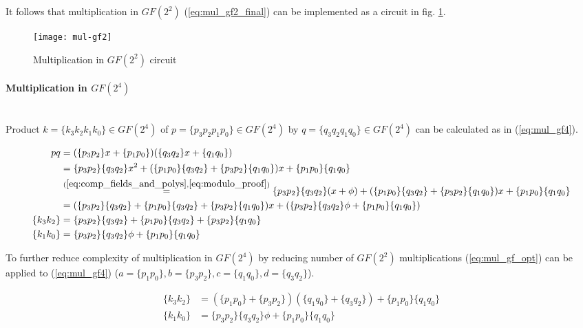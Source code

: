 It follows that multiplication in $GF(2^2)$ (\ref{eq:mul_gf2_final}) can be implemented as a circuit in fig. \ref{fig:mul_gf2}.

\begin{figure}[!h]
\label{fig:mul_gf2}
\centering
\texttt{[image: mul-gf2]}
\caption{Multiplication in $GF(2^2)$ circuit}
\end{figure}



\paragraph{Multiplication in $GF(2^4)$}\mbox{}\\
Product $k = \{k_3k_2k_1k_0\} \in GF(2^4)$ of $p = \{p_3p_2p_1p_0\} \in GF(2^4)$ by $q = \{q_3q_2q_1q_0\} \in GF(2^4)$ can be calculated as in (\ref{eq:mul_gf4}).

\begin{equation}
\label{eq:mul_gf4}
\begin{aligned}
pq &= (\{p_3p_2\}x + \{p_1p_0\})(\{q_3q_2\}x + \{q_1q_0\})\\
&= \{p_3p_2\}\{q_3q_2\}x^2 + (\{p_1p_0\}\{q_3q_2\} + \{p_3p_2\}\{q_1q_0\})x + \{p_1p_0\}\{q_1q_0\} \\
&\stackrel{(\ref{eq:comp_fields_and_polys}, \ref{eq:modulo_proof})}{=}
\{p_3p_2\}\{q_3q_2\}(x + \phi) + (\{p_1p_0\}\{q_3q_2\} + \{p_3p_2\}\{q_1q_0\})x + \{p_1p_0\}\{q_1q_0\} \\
&= (\{p_3p_2\}\{q_3q_2\} + \{p_1p_0\}\{q_3q_2\} + \{p_3p_2\}\{q_1q_0\})x + (\{p_3p_2\}\{q_3q_2\}\phi + \{p_1p_0\}\{q_1q_0\})\\
\{k_3k_2\} &= \{p_3p_2\}\{q_3q_2\} + \{p_1p_0\}\{q_3q_2\} + \{p_3p_2\}\{q_1q_0\}\\
\{k_1k_0\} &= \{p_3p_2\}\{q_3q_2\}\phi + \{p_1p_0\}\{q_1q_0\}
\end{aligned}
\end{equation}

To further reduce complexity of multiplication in $GF(2^4)$ by reducing number of $GF(2^2)$ multiplications (\ref{eq:mul_gf_opt}) can be applied to (\ref{eq:mul_gf4}) ($a = \{p_1p_0\}, b = \{p_3p_2\}, c = \{q_1q_0\}, d = \{q_3q_2\}$).

\begin{equation}
\label{eq:mul_gf4_final}
\begin{aligned}
\{k_3k_2\} &= (\{p_1p_0\} + \{p_3p_2\})(\{q_1q_0\} + \{q_3q_2\}) + \{p_1p_0\}\{q_1q_0\}\\
\{k_1k_0\} &= \{p_3p_2\}\{q_3q_2\}\phi + \{p_1p_0\}\{q_1q_0\}
\end{aligned}
\end{equation}



